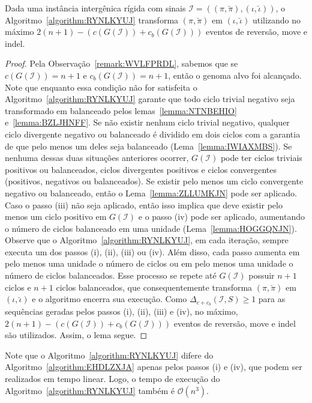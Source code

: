 \begin{lemma}\label{lemma:PBDEKMXG}
Dada uma instância intergênica rígida com sinais $\mathcal{I}=((\pi,\breve\pi),(\iota,\breve\iota))$, o Algoritmo~\ref{algorithm:RYNLKYUJ} transforma $(\pi,\breve\pi)$ em $(\iota,\breve\iota)$ utilizando no máximo $2(n + 1) - (c(G(\mathcal{I})) + c_b(G(\mathcal{I})))$ eventos de reversão, move e indel.
\end{lemma}
\begin{proof}
Pela Observação~\ref{remark:WVLFPRDL}, sabemos que se $c(G(\mathcal{I})) = {n + 1}$ e $c_b(G(\mathcal{I})) = {n + 1}$, então o genoma alvo foi alcançado. Note que enquanto essa condição não for satisfeita o Algoritmo~\ref{algorithm:RYNLKYUJ} garante que todo ciclo trivial negativo seja transformado em balanceado pelos lemas~\ref{lemma:NTNBEHIO} e~\ref{lemma:BZLJHNFF}. Se não existir nenhum ciclo trivial negativo, qualquer ciclo divergente negativo ou balanceado é dividido em dois ciclos com a garantia de que pelo menos um deles seja balanceado (Lema~\ref{lemma:IWIAXMBS}). Se nenhuma dessas duas situações anteriores ocorrer, $G(\mathcal{I})$ pode ter ciclos triviais positivos ou balanceados, ciclos divergentes positivos e ciclos convergentes (positivos, negativos ou balanceados). Se existir pelo menos um ciclo convergente negativo ou balanceado, então o Lema~\ref{lemma:ZLLUMKJN} pode ser aplicado. Caso o passo (iii) não seja aplicado, então isso implica que deve existir pelo menos um ciclo positivo em $G(\mathcal{I})$ e o passo (iv) pode ser aplicado, aumentando o número de ciclos balanceado em uma unidade (Lema~\ref{lemma:HOGGQNJN}). Observe que o Algoritmo~\ref{algorithm:RYNLKYUJ}, em cada iteração, sempre executa um dos passos (i), (ii), (iii) ou (iv). Além disso, cada passo aumenta em pelo menos uma unidade o número de ciclos ou em pelo menos uma unidade o número de ciclos balanceados. Esse processo se repete até $G(\mathcal{I})$ possuir ${n+1}$ ciclos e ${n+1}$ ciclos balanceados, que consequentemente transforma $(\pi, \breve\pi)$ em $(\iota,\breve\iota)$ e o algoritmo encerra sua execução.  Como $\Delta_{c+c_b}(\mathcal{I},S) \ge 1$ para as sequências geradas pelos passos (i), (ii), (iii) e (iv), no máximo, $2(n + 1) - (c(G(\mathcal{I})) + c_b(G(\mathcal{I})))$ eventos de reversão, move e indel são utilizados. Assim, o lema segue.
\end{proof}

Note que o Algoritmo~\ref{algorithm:RYNLKYUJ} difere do Algoritmo~\ref{algorithm:EHDLZXJA} apenas pelos passos (i) e (iv), que podem ser realizados em tempo linear. Logo, o tempo de execução do Algoritmo~\ref{algorithm:RYNLKYUJ} também é $\mathcal{O}(n^3)$.

